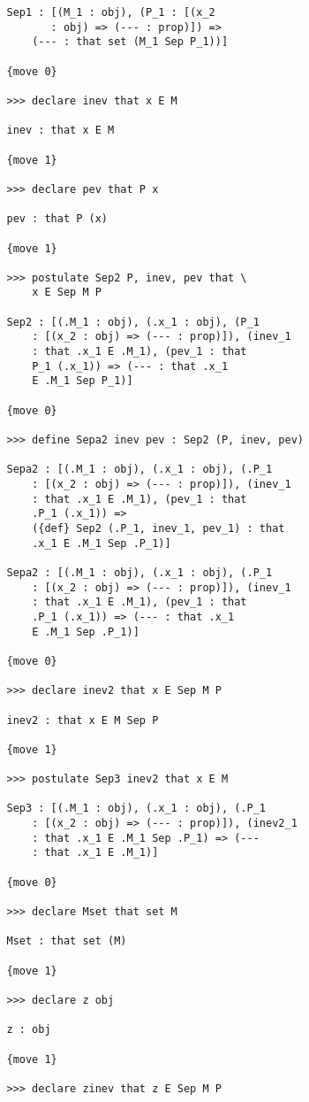 \documentclass[12pt]{article}
\begin{document}
\begin{enumerate}
\begin{verbatim}
   Sep1 : [(M_1 : obj), (P_1 : [(x_2 
          : obj) => (--- : prop)]) => 
       (--- : that set (M_1 Sep P_1))]

   {move 0}

   >>> declare inev that x E M

   inev : that x E M

   {move 1}

   >>> declare pev that P x

   pev : that P (x)

   {move 1}

   >>> postulate Sep2 P, inev, pev that \
       x E Sep M P

   Sep2 : [(.M_1 : obj), (.x_1 : obj), (P_1 
       : [(x_2 : obj) => (--- : prop)]), (inev_1 
       : that .x_1 E .M_1), (pev_1 : that 
       P_1 (.x_1)) => (--- : that .x_1 
       E .M_1 Sep P_1)]

   {move 0}

   >>> define Sepa2 inev pev : Sep2 (P, inev, pev)

   Sepa2 : [(.M_1 : obj), (.x_1 : obj), (.P_1 
       : [(x_2 : obj) => (--- : prop)]), (inev_1 
       : that .x_1 E .M_1), (pev_1 : that 
       .P_1 (.x_1)) => 
       ({def} Sep2 (.P_1, inev_1, pev_1) : that 
       .x_1 E .M_1 Sep .P_1)]

   Sepa2 : [(.M_1 : obj), (.x_1 : obj), (.P_1 
       : [(x_2 : obj) => (--- : prop)]), (inev_1 
       : that .x_1 E .M_1), (pev_1 : that 
       .P_1 (.x_1)) => (--- : that .x_1 
       E .M_1 Sep .P_1)]

   {move 0}

   >>> declare inev2 that x E Sep M P

   inev2 : that x E M Sep P

   {move 1}

   >>> postulate Sep3 inev2 that x E M

   Sep3 : [(.M_1 : obj), (.x_1 : obj), (.P_1 
       : [(x_2 : obj) => (--- : prop)]), (inev2_1 
       : that .x_1 E .M_1 Sep .P_1) => (--- 
       : that .x_1 E .M_1)]

   {move 0}

   >>> declare Mset that set M

   Mset : that set (M)

   {move 1}

   >>> declare z obj

   z : obj

   {move 1}

   >>> declare zinev that z E Sep M P


\end{verbatim}
\end{enumerate}
\end{document}
